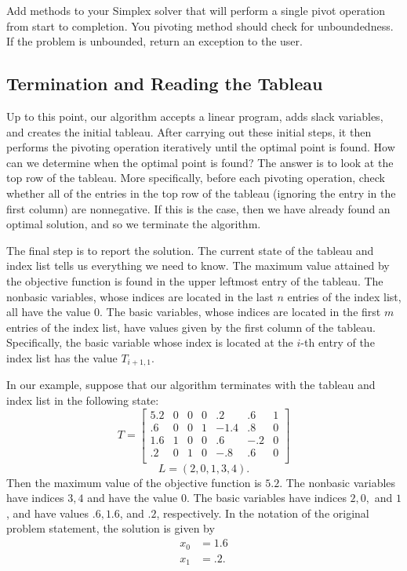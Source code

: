 \begin{problem}
Add methods to your Simplex solver that will perform a single pivot operation from start to completion.
You pivoting method should check for unboundedness.
If the problem is unbounded, return an exception to the user.
\end{problem}

\subsection{Termination and Reading the Tableau}
Up to this point, our algorithm accepts a linear program, adds slack variables, and creates the initial tableau. After
carrying out these initial steps, it then performs the pivoting operation iteratively until the optimal point is found. 
How can we determine when the optimal point is found? The answer is to look at the top row of the tableau. More specifically,
before each pivoting operation, check whether all of the entries in the top row of the tableau (ignoring the entry in the first
column) are nonnegative. If this is the case, then we have already found an optimal solution, and so we terminate the algorithm.

The final step is to report the solution. The current state of the tableau and index list tells us everything we need to know.
The maximum value attained by the objective function is found in the upper leftmost entry of the tableau. The nonbasic variables,
whose indices are located in the last $n$ entries of the index list, all have the value $0$. The basic variables, whose indices
are located in the first $m$ entries of the index list, have values given by the first column of the tableau. Specifically, the basic
variable whose index is located at the $i$-th entry of the index list has the value $T_{i+1, 1}$. 

In our example, suppose that our algorithm terminates with the tableau and index list in the following state:
\[
T = \begin{bmatrix}
5.2 & 0 & 0 & 0 & .2 & .6 & 1\\
.6 & 0 & 0 & 1 & -1.4 & .8 & 0\\
1.6 & 1 & 0 & 0 & .6 & -.2 & 0\\
.2 & 0 & 1 & 0 & -.8 & .6 & 0\\
\end{bmatrix}
\]
\[
L = (2, 0, 1, 3, 4).
\]
Then the maximum value of the objective function is $5.2$. The nonbasic variables have indices $3, 4$ and have the value $0$.
The basic variables have indices $2, 0,$ and $1$, and have values $.6, 1.6$, and $.2$, respectively.
In the notation of the original problem statement, the solution is given by
\begin{align*}
x_0 &= 1.6\\
x_1 &= .2.
\end{align*}

